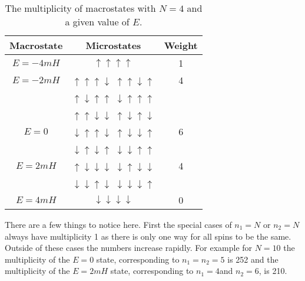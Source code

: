 \documentclass[a4paper]{article}
\begin{document}
    \begin{table}[ht]
        \centering
        \begin{tabular}{ccc}\hline
            Macrostate & Microstates & Weight\\\hline
            \(E = -4mH\) & \(\uparrow\uparrow\uparrow\uparrow\) & 1\\\hline
            \(E = -2mH\) & \(\uparrow\uparrow\uparrow\downarrow\) \(\uparrow\uparrow\downarrow\uparrow\) & 4\\
            & \(\uparrow\downarrow\uparrow\uparrow\) \(\downarrow\uparrow\uparrow\uparrow\) & \\\hline
            & \(\uparrow\uparrow\downarrow\downarrow\) \(\uparrow\downarrow\uparrow\downarrow\) & \\
            \(E = 0\) & \(\downarrow\uparrow\uparrow\downarrow\) \(\uparrow\downarrow\downarrow\uparrow\) & 6\\
            & \(\downarrow\uparrow\downarrow\uparrow\) \(\downarrow\downarrow\uparrow\uparrow\) & \\\hline
            \(E = 2mH\) & \(\uparrow\downarrow\downarrow\downarrow\) \(\downarrow\uparrow\downarrow\downarrow\) & 4\\
            & \(\downarrow\downarrow\uparrow\downarrow\)  \(\downarrow\downarrow\downarrow\uparrow\) & \\\hline
            \(E = 4mH\) & \(\downarrow\downarrow\downarrow\downarrow\) & 0\\\hline
        \end{tabular}
        \caption{The multiplicity of macrostates with \(N = 4\) and a given value of \(E\).}
        \label{tab:multiplicity N = 4}
    \end{table}
    There are a few things to notice here.
    First the special cases of \(n_1 = N\) or \(n_2 = N\) always have multiplicity 1 as there is only one way for all spins to be the same.
    Outside of these cases the numbers increase rapidly.
    For example for \(N = 10\) the multiplicity of the \(E = 0\) state, corresponding to \(n_1 = n_2 = 5\) is 252 and the multiplicity of the \(E = 2mH\) state, corresponding to \(n_1 = 4\)and \(n_2 = 6\), is 210.
    
\end{document}
